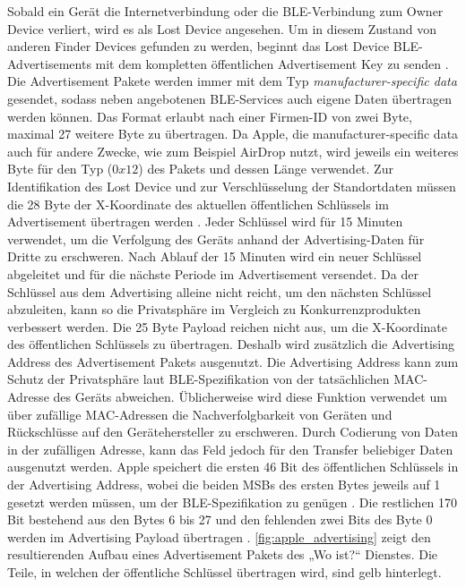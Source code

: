 Sobald ein Gerät die Internetverbindung oder die \ac{BLE}-Verbindung zum Owner Device verliert, wird es als Lost Device angesehen.
Um in diesem Zustand von anderen Finder Devices gefunden zu werden, beginnt das Lost Device \ac{BLE}-Advertisements mit dem kompletten öffentlichen Advertisement Key zu senden \cite{Apple_FindMySpec}.
Die Advertisement Pakete werden immer mit dem Typ \textit{manufacturer-specific data} gesendet, sodass neben angebotenen \ac{BLE}-Services auch eigene Daten übertragen werden können.
Das Format erlaubt nach einer Firmen-ID von zwei Byte, maximal 27 weitere Byte zu übertragen.
Da Apple, die manufacturer-specific data auch für andere Zwecke, wie zum Beispiel AirDrop nutzt, wird jeweils ein weiteres Byte für den Typ ($0x12$) des Pakets und dessen Länge verwendet.
Zur Identifikation des Lost Device und zur Verschlüsselung der Standortdaten müssen die 28 Byte der X-Koordinate des aktuellen öffentlichen Schlüssels im Advertisement übertragen werden \cite{Heinrich_FindMy}.
Jeder Schlüssel wird für 15 Minuten verwendet, um die Verfolgung des Geräts anhand der Advertising-Daten für Dritte zu erschweren.
Nach Ablauf der 15 Minuten wird ein neuer Schlüssel abgeleitet und für die nächste Periode im Advertisement versendet.
Da der Schlüssel aus dem Advertising alleine nicht reicht, um den nächsten Schlüssel abzuleiten, kann so die Privatsphäre im Vergleich zu Konkurrenzprodukten verbessert werden.
Die 25 Byte Payload reichen nicht aus, um die X-Koordinate des öffentlichen Schlüssels zu übertragen.
Deshalb  wird zusätzlich die Advertising Address des Advertisement Pakets ausgenutzt.
Die Advertising Address kann zum Schutz der Privatsphäre laut \ac{BLE}-Spezifikation \cite{Spec_BLE_5.3} von der tatsächlichen \ac{MAC}-Adresse des Geräts abweichen.
Üblicherweise wird diese Funktion verwendet um über zufällige \ac{MAC}-Adressen die Nachverfolgbarkeit von Geräten und Rückschlüsse auf den Gerätehersteller zu erschweren.
Durch Codierung von Daten in der zufälligen Adresse, kann das Feld jedoch für den Transfer beliebiger Daten ausgenutzt werden.
Apple speichert die ersten 46 Bit des öffentlichen Schlüssels in der Advertising Address, wobei die beiden \acp{MSB} des ersten Bytes jeweils auf 1 gesetzt werden müssen, um der \ac{BLE}-Spezifikation zu genügen \cite{Heinrich_FindMy}.
Die restlichen 170 Bit bestehend aus den Bytes 6 bis 27 und den fehlenden zwei Bits des Byte 0 werden im Advertising Payload übertragen \cite{Apple_FindMySpec}.
\autoref{fig:apple_advertising} zeigt den resultierenden Aufbau eines Advertisement Pakets des „Wo ist?“ Dienstes.
Die Teile, in welchen der öffentliche Schlüssel übertragen wird, sind gelb hinterlegt.
